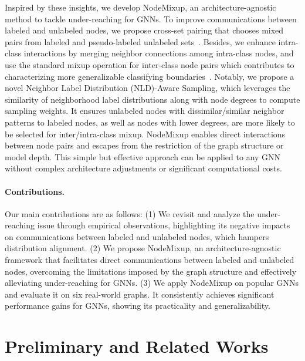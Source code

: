 \documentclass[letterpaper]{article} %
\begin{document}
Inspired by these insights, we develop NodeMixup, an architecture-agnostic method to tackle under-reaching for GNNs. To improve communications between labeled and unlabeled nodes, we propose cross-set pairing that chooses mixed pairs from labeled and pseudo-labeled unlabeled sets~\cite{pl}. Besides, we enhance intra-class interactions by merging neighbor connections among intra-class nodes, and use the standard mixup operation for inter-class node pairs which contributes to characterizing more generalizable classifying boundaries~\cite{mixup}. Notably, we propose a novel Neighbor Label Distribution (NLD)-Aware Sampling, which leverages the similarity of neighborhood label distributions along with node degrees to compute sampling weights. It ensures unlabeled nodes with dissimilar/similar neighbor patterns to labeled nodes, as well as nodes with lower degrees, are more likely to be selected for inter/intra-class mixup. NodeMixup enables direct interactions between node pairs and escapes from the restriction of the graph structure or model depth. This simple but effective approach can be applied to any GNN without complex architecture adjustments or significant computational costs.

\paragraph{Contributions.}
Our main contributions are as follows: (1) We revisit and analyze the under-reaching issue through empirical observations, highlighting its negative impacts on communications between labeled and unlabeled nodes, which hampers distribution alignment. (2) We propose NodeMixup, an architecture-agnostic framework that facilitates direct communications between labeled and unlabeled nodes, overcoming the limitations imposed by the graph structure and effectively alleviating under-reaching for GNNs. (3) We apply NodeMixup on popular GNNs and evaluate it on six real-world graphs. It consistently achieves significant performance gains for GNNs, showing its practicality and generalizability.

\section{Preliminary and Related Works}
\label{sec:related}
\end{document}
